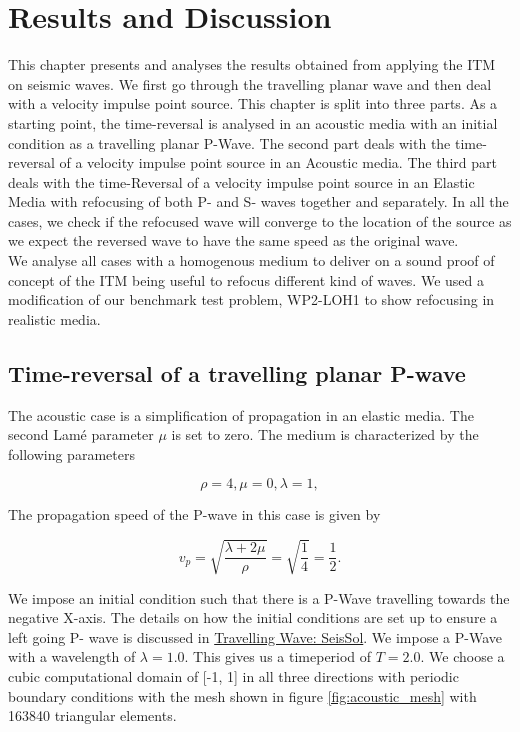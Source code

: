 \chapter{Results and Discussion}\label{chapter:Results}

This chapter presents and analyses the results obtained from applying the \ac{ITM} on seismic waves. We first go through the travelling planar wave and then deal with
a velocity impulse point source. This chapter is split into three parts. As a starting point, the time-reversal is analysed in an acoustic media with an initial condition
as a travelling planar P-Wave. The second part deals with the time-reversal of a velocity impulse point source in an Acoustic media. The third part deals with the time-Reversal
of a velocity impulse point source in an Elastic Media with refocusing of both P- and S- waves together and separately. In all the cases, we check if the refocused
wave will converge to the location of the source as we expect the reversed wave to have the same speed as the original wave. \\

We analyse all cases with a homogenous medium to deliver on a sound proof of concept of the \ac{ITM} being useful to refocus different kind of waves. We used a modification
of our benchmark test problem, WP2-LOH1 to show refocusing in realistic media.

\section{Time-reversal of a travelling planar P-wave} \label{sec:acoustictravelling}
The acoustic case is a simplification of propagation in an elastic media. The second Lam\'{e} parameter $\mu$ is set to zero. The medium is characterized by the following parameters

\begin{equation}
    \rho = 4, \mu = 0, \lambda = 1 ,
\end{equation}

The propagation speed of the P-wave in this case is given by

\begin{equation}
    v_p = \sqrt{\frac{\lambda + 2 \mu}{\rho}} = \sqrt{\frac{1}{4}} = \frac{1}{2} .
\end{equation}

We impose an initial condition such that there is a P-Wave travelling towards the negative X-axis. The details on how the initial conditions are set up to ensure a left going P- wave is discussed in
\href{https://seissol.readthedocs.io/en/latest/initial-condition.html#travelling-wave}{Travelling Wave: SeisSol}. We impose a P-Wave with a wavelength of 
$\lambda = 1.0$. This gives us a timeperiod of $T=2.0$. We choose a cubic computational domain of [-1, 1] in all three directions with periodic boundary conditions with the mesh shown in figure \ref{fig:acoustic_mesh} with
163840 triangular elements. 

